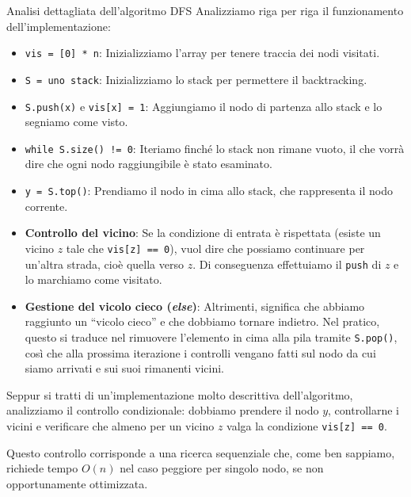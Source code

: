 \documentclass[12pt]{report}
\begin{document}
	\begin{algoritmo}{Analisi dettagliata dell'algoritmo DFS}{}
		Analizziamo riga per riga il funzionamento dell'implementazione:
		\begin{itemize}
			\item \texttt{vis = [0] * n}: Inizializziamo l'array per tenere traccia dei nodi visitati.
			
			\item \texttt{S = uno stack}: Inizializziamo lo stack per permettere il backtracking.
			
			\item \texttt{S.push(x)} e \texttt{vis[x] = 1}: Aggiungiamo il nodo di partenza allo stack e lo segniamo come visto.
			
			\item \texttt{while S.size() != 0}: Iteriamo finché lo stack non rimane vuoto, il che vorrà dire che ogni nodo raggiungibile è stato esaminato.
			
			\item \texttt{y = S.top()}: Prendiamo il nodo in cima allo stack, che rappresenta il nodo corrente.
			
			\item \textbf{Controllo del vicino}: Se la condizione di entrata è rispettata (esiste un vicino $z$ tale che \texttt{vis[z] == 0}), vuol dire che possiamo continuare per un'altra strada, cioè quella verso $z$. Di conseguenza effettuiamo il \texttt{push} di $z$ e lo marchiamo come visitato.
			
			\item \textbf{Gestione del vicolo cieco (\emph{else})}: Altrimenti, significa che abbiamo raggiunto un ``vicolo cieco'' e che dobbiamo tornare indietro. Nel pratico, questo si traduce nel rimuovere l'elemento in cima alla pila tramite \texttt{S.pop()}, così che alla prossima iterazione i controlli vengano fatti sul nodo da cui siamo arrivati e sui suoi rimanenti vicini.
			
		\end{itemize}
	\end{algoritmo}
	
	Seppur si tratti di un'implementazione molto descrittiva dell'algoritmo, analizziamo il controllo condizionale: dobbiamo prendere il nodo $y$, controllarne i vicini e verificare che almeno per un vicino $z$ valga la condizione \texttt{vis[z] == 0}. 
	
	Questo controllo corrisponde a una ricerca sequenziale che, come ben sappiamo, richiede tempo $O(n)$ nel caso peggiore per singolo nodo, se non opportunamente ottimizzata.
	
\end{document}
